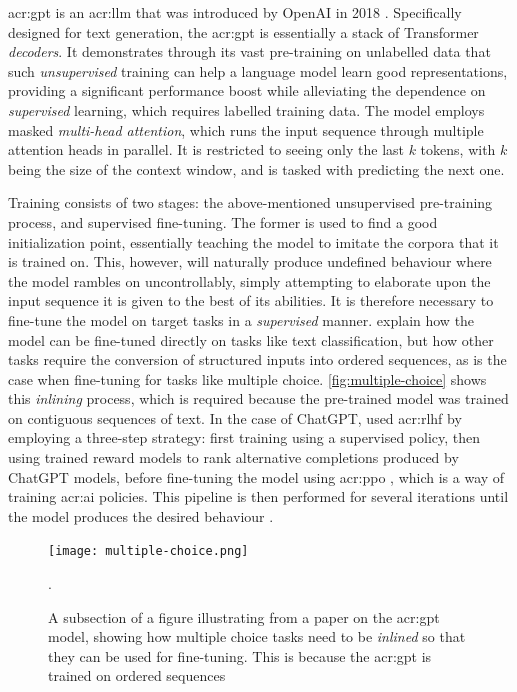 \gls{acr:gpt} is an \acrshort{acr:llm} that was introduced by OpenAI in 2018 \citep{radfordImprovingLanguageUnderstanding2018}. Specifically designed for text generation, the \acrshort{acr:gpt} is essentially a stack of Transformer \textit{decoders}. It demonstrates through its vast pre-training on unlabelled data that such \textit{unsupervised} training can help a language model learn good representations, providing a significant performance boost while alleviating the dependence on \textit{supervised} learning, which requires labelled training data. The model employs masked \textit{multi-head attention}, which runs the input sequence through multiple attention heads in parallel. It is restricted to seeing only the last $k$ tokens, with $k$ being the size of the context window, and is tasked with predicting the next one.

Training consists of two stages: the above-mentioned unsupervised pre-training process, and supervised fine-tuning. The former is used to find a good initialization point, essentially teaching the model to imitate the corpora that it is trained on. This, however, will naturally produce undefined behaviour where the model rambles on uncontrollably, simply attempting to elaborate upon the input sequence it is given to the best of its abilities. It is therefore necessary to fine-tune the model on target tasks in a \textit{supervised} manner. \cite[4]{radfordImprovingLanguageUnderstanding2018} explain how the model can be fine-tuned directly on tasks like text classification, but how other tasks require the conversion of structured inputs into ordered sequences, as is the case when fine-tuning for tasks like multiple choice. \autoref{fig:multiple-choice} shows this \textit{inlining} process, which is required because the pre-trained model was trained on contiguous sequences of text. In the case of ChatGPT, \citeauthor{openaiIntroducingChatGPT2022} used \gls{acr:rlhf} \citep{christianoDeepReinforcementLearning2023} by employing a three-step strategy: first training using a supervised policy, then using trained reward models to rank alternative completions produced by ChatGPT models, before fine-tuning the model using \gls{acr:ppo} \citep{schulmanProximalPolicyOptimization2017}, which is a way of training \acrshort{acr:ai} policies. This pipeline is then performed for several iterations until the model produces the desired behaviour \citep{openaiIntroducingChatGPT2022}.

\begin{figure}
    \centering
    \texttt{[image: multiple-choice.png]}
    \caption[Inlining of a multiple choice task for GPT fine-tuning]{A subsection of a figure illustrating from a paper on the \acrshort{acr:gpt} model, showing how multiple choice tasks need to be \textit{inlined} so that they can be used for fine-tuning. This is because the \acrshort{acr:gpt} is trained on ordered sequences \citep[4]{radfordImprovingLanguageUnderstanding2018}}.
    \label{fig:multiple-choice}
\end{figure}


